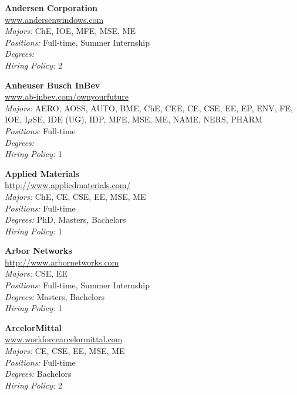 \documentclass[twoside]{article}
\begin{document}
\begin{center}
\begin{multicols}{3}
\begin{minipage}{.9\columnwidth}{\Large\bf Andersen Corporation }\\
	\url{www.andersenwindows.com}\\
	\emph{Majors:} ChE, IOE, MFE, MSE, ME\\
	\emph{Positions:} Full-time, Summer Internship\\
	\emph{Degrees:} \\
	\emph{Hiring Policy:} 2\\
\end{minipage}
 
\begin{minipage}{.9\columnwidth}{\Large\bf Anheuser Busch InBev }\\
	\url{www.ab-inbev.com/ownyourfuture}\\
	\emph{Majors:} AERO, AOSS, AUTO, BME, ChE, CEE, CE, CSE, EE, EP, ENV, FE, IOE, I$\mu$SE, IDE (UG), IDP, MFE, MSE, ME, NAME, NERS, PHARM\\
	\emph{Positions:} Full-time\\
	\emph{Degrees:} \\
	\emph{Hiring Policy:} 1\\
\end{minipage}
 
\begin{minipage}{.9\columnwidth}{\Large\bf Applied Materials }\\
	\url{http://www.appliedmaterials.com/}\\
	\emph{Majors:} ChE, CE, CSE, EE, MSE, ME\\
	\emph{Positions:} Full-time\\
	\emph{Degrees:} PhD, Masters, Bachelors\\
	\emph{Hiring Policy:} 1\\
\end{minipage}
 
\begin{minipage}{.9\columnwidth}{\Large\bf Arbor Networks }\\
	\url{http://www.arbornetworks.com}\\
	\emph{Majors:} CSE, EE\\
	\emph{Positions:} Full-time, Summer Internship\\
	\emph{Degrees:} Masters, Bachelors\\
	\emph{Hiring Policy:} 1\\
\end{minipage}
 
\begin{minipage}{.9\columnwidth}{\Large\bf ArcelorMittal }\\
	\url{www.workforcearcelormittal.com}\\
	\emph{Majors:} CE, CSE, EE, MSE, ME\\
	\emph{Positions:} Full-time\\
	\emph{Degrees:} Bachelors\\
	\emph{Hiring Policy:} 2\\
\end{minipage}
 

\end{multicols}
\end{center}
\end{document}
